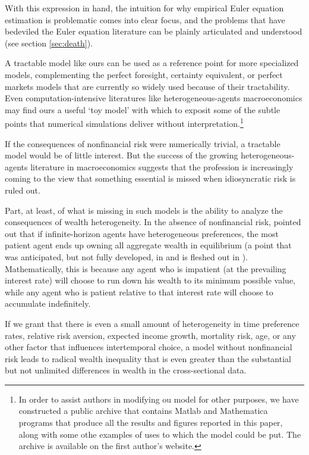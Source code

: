 \documentclass[titlepage,abstract]{\econtex}\newcommand{\texname}{ctDiscrete}
\begin{document}
With this expression in hand, the intuition for why empirical Euler equation
estimation is problematic comes into clear focus, and the problems that have
bedeviled the Euler equation literature can be plainly articulated and
understood (see section \ref{sec:death}).


A tractable model like ours can be used as a reference point for more
specialized models, complementing the perfect foresight, certainty
equivalent, or perfect markets models that are currently so widely
used because of their tractability. Even computation-intensive
literatures like heterogeneous-agents macroeconomics may find ours a
useful `toy model' with which to exposit some of the
subtle points that numerical simulations deliver without
interpretation.\footnote{In order to assist authors in modifying ou
  model for other purposes, we have constructed a public archive that
  contains Matlab and Mathematica programs that produce all the
  results and figures reported in this paper, along with some othe
  examples of uses to which the model could be put.  The archive is
  available on the first author's website.}

  If the consequences of nonfinancial risk were numerically
  trivial, a tractable model would be of little interest.  But the
  success of the growing heterogeneous-agents literature in
  macroeconomics suggests that the profession is increasingly coming
  to the view that something essential is missed when idiosyncratic
  risk is ruled out.

  Part, at least, of what is missing in such models is the ability to
  analyze the consequences of wealth heterogeneity.  In the absence of
  nonfinancial risk, \cite{uzawa:patientownall} pointed out that if
  infinite-horizon agents have heterogeneous preferences, the most
  patient agent ends up owning all aggregate wealth in equilibrium (a point 
that was anticipated, but not fully developed, in \cite{ramsey:save} and is
fleshed out in \cite{beckerWealth}).  
  Mathematically, this is because any agent who is impatient (at the
  prevailing interest rate) will choose to run down his wealth to its
  minimum possible value, while any agent who is patient relative to
  that interest rate will choose to accumulate indefinitely.
  

  If we grant that there is even a small amount of heterogeneity in
  time preference rates, relative risk aversion, expected income
  growth, mortality risk, age, or any other factor that influences
  intertemporal choice, a model without nonfinancial risk leads to
  radical wealth inequality that is even greater than 
  the substantial but not unlimited differences in wealth in the
  cross-sectional data.
  
\end{document}
